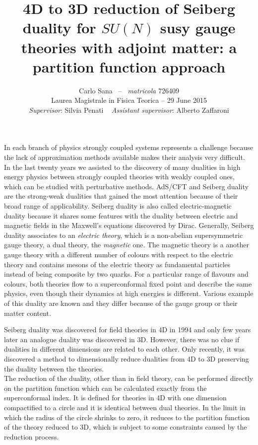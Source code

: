 \documentclass[a4paper,12pt]{article}
\author{
 Carlo Sana  ~--~ \emph{matricola} 726409 \\
 Laurea Magistrale in Fisica Teorica -- 29 June 2015\\
\emph{Supervisor}: Silvia Penati 
~
\emph{Assistant supervisor}: Alberto Zaffaroni\\
}
\date{}
\title{ \textbf{4D to 3D reduction of Seiberg duality for $SU(N)$ susy gauge theories with adjoint matter: a partition function approach }}
\begin{document}
\maketitle
In each branch of physics strongly coupled systems represents a challenge because the lack of approximation methods available makes their analysis very difficult.\\
In the last twenty years we assisted to the discovery of many dualities in high energy physics between strongly coupled theories with weakly coupled ones, which can be studied with perturbative methods.
AdS/CFT  and Seiberg duality are the strong-weak dualities that gained the most attention because of their broad range of applicability.
Seiberg duality is also called electric-magnetic duality because it shares some features with the duality between electric and magnetic fields in the Maxwell's equations discovered by Dirac.
Generally, Seiberg duality associates to an \emph{electric theory}, which is a non-abelian supersymmetric gauge theory, a dual theory, the \emph{magnetic} one. 
The magnetic theory is a another gauge theory with a different number of colours with respect to the electric theory and contains mesons of the electric theory as fundamental particles instead of being composite by two quarks.
For a particular range of flavours and colours, both theories flow to a superconformal fixed point and describe the same physics, even though their dynamics at high energies is different.
Various example of this duality are known and they differ because of the gauge group or their matter content.

Seiberg duality was discovered for field theories in 4D in 1994 and only few years later an analogue duality was discovered in 3D.
However, there was no clue if dualities in different dimensions are related to each other.
Only recently, it was discovered a method to dimensionally reduce dualities from 4D to 3D preserving the duality between the theories.\\
The reduction of the duality, other than in field theory, can be performed directly on the partition function which can be calculated exactly from the superconformal index. 
It is defined for theories in 4D with one dimension compactified to a circle and it is identical between dual theories.
In the limit in which the radius of the circle shrinks to zero, it reduces to the partition function of the theory reduced to 3D, which is subject to some constraints caused by the reduction process.
\end{document}
